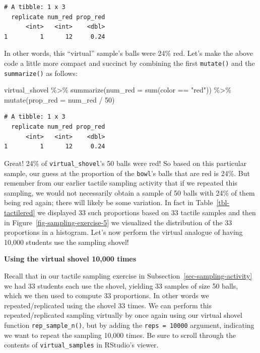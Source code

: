 \documentclass[
  letterpaper,
  DIV=11,
  numbers=noendperiod]{scrreprt}
\newenvironment{Shaded}{\begin{snugshade}}{\end{snugshade}}
\newcommand{\AttributeTok}[1]{\textcolor[rgb]{0.40,0.45,0.13}{#1}}
\newcommand{\DecValTok}[1]{\textcolor[rgb]{0.68,0.00,0.00}{#1}}
\newcommand{\FunctionTok}[1]{\textcolor[rgb]{0.28,0.35,0.67}{#1}}
\newcommand{\NormalTok}[1]{\textcolor[rgb]{0.00,0.23,0.31}{#1}}
\newcommand{\SpecialCharTok}[1]{\textcolor[rgb]{0.37,0.37,0.37}{#1}}
\newcommand{\StringTok}[1]{\textcolor[rgb]{0.13,0.47,0.30}{#1}}
\theoremstyle{definition}
\theoremstyle{remark}
\begin{document}
\begin{verbatim}
# A tibble: 1 x 3
  replicate num_red prop_red
      <int>   <int>    <dbl>
1         1      12     0.24
\end{verbatim}

In other words, this ``virtual'' sample's balls were 24\% red. Let's
make the above code a little more compact and succinct by combining the
first \texttt{mutate()} and the \texttt{summarize()} as follows:

\begin{Shaded}
\begin{Highlighting}[]
\NormalTok{virtual\_shovel }\SpecialCharTok{\%\textgreater{}\%} 
  \FunctionTok{summarize}\NormalTok{(}\AttributeTok{num\_red =} \FunctionTok{sum}\NormalTok{(color }\SpecialCharTok{==} \StringTok{"red"}\NormalTok{)) }\SpecialCharTok{\%\textgreater{}\%} 
  \FunctionTok{mutate}\NormalTok{(}\AttributeTok{prop\_red =}\NormalTok{ num\_red }\SpecialCharTok{/} \DecValTok{50}\NormalTok{)}
\end{Highlighting}
\end{Shaded}

\begin{verbatim}
# A tibble: 1 x 3
  replicate num_red prop_red
      <int>   <int>    <dbl>
1         1      12     0.24
\end{verbatim}

Great! 24\% of \texttt{virtual\_shovel}'s 50 balls were red! So based on
this particular sample, our guess at the proportion of the
\texttt{bowl}'s balls that are red is 24\%. But remember from our
earlier tactile sampling activity that if we repeated this sampling, we
would not necessarily obtain a sample of 50 balls with 24\% of them
being red again; there will likely be some variation. In fact in
Table~\ref{tbl-tactilered} we displayed 33 such proportions based on 33
tactile samples and then in Figure~\ref{fig-sampling-exercise-5} we
visualized the distribution of the 33 proportions in a histogram. Let's
now perform the virtual analogue of having 10,000 students use the
sampling shovel!

\textbf{Using the virtual shovel 10,000 times}

Recall that in our tactile sampling exercise in
Subsection~\ref{sec-sampling-activity} we had 33 students each use the
shovel, yielding 33 samples of size 50 balls, which we then used to
compute 33 proportions. In other words we repeated/replicated using the
shovel 33 times. We can perform this repeated/replicated sampling
virtually by once again using our virtual shovel function
\texttt{rep\_sample\_n()}, but by adding the \texttt{reps\ =\ 10000}
argument, indicating we want to repeat the sampling 10,000 times. Be
sure to scroll through the contents of \texttt{virtual\_samples} in
RStudio's viewer.
\end{document}
